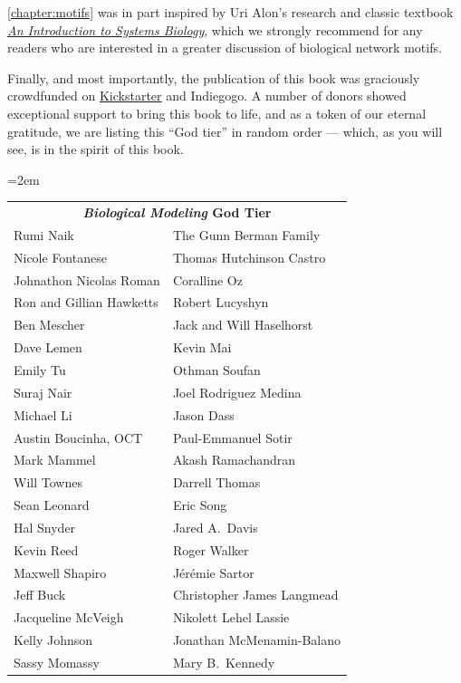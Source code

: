 \autoref{chapter:motifs} was in part inspired by Uri Alon’s research and classic textbook \href{https://www.weizmann.ac.il/mcb/UriAlon/introduction-systems-biology-design-principles-biological-circuits}{\textit{An Introduction to Systems Biology}}, which we strongly recommend for any readers who are interested in a greater discussion of biological network motifs.

Finally, and most importantly, the publication of this book was graciously crowdfunded on \href{https://www.kickstarter.com/projects/phillipcompeau/biological-modeling-a-short-tour?ref=user_menu}{Kickstarter} and Indiegogo. A number of donors showed exceptional support to bring this book to life, and as a token of our eternal gratitude, we are listing this ``God tier'' in random order --- which, as you will see, is in the spirit of this book.
\begin{center}
\tabcolsep=2em
\begin{tabular}{l l}
\multicolumn{2}{c}{\textbf{\textit{Biological Modeling} God Tier}}\\[4ex]
Rumi Naik & The Gunn Berman Family\\
Nicole Fontanese & Thomas Hutchinson Castro\\
Johnathon Nicolas Roman & Coralline Oz\\
Ron and Gillian Hawketts & Robert Lucyshyn\\
Ben Mescher & Jack and Will Haselhorst\\
Dave Lemen & Kevin Mai\\
Emily Tu & Othman Soufan\\
Suraj Nair & Joel Rodriguez Medina\\
Michael Li & Jason Dass\\
Austin Boucinha, OCT & Paul-Emmanuel Sotir\\
Mark Mammel & Akash Ramachandran\\
Will Townes & Darrell Thomas\\
Sean Leonard & Eric Song\\
Hal Snyder & Jared A.~Davis\\
Kevin Reed & Roger Walker\\
Maxwell Shapiro & Jérémie Sartor\\
Jeff Buck & Christopher James Langmead\\
Jacqueline McVeigh & Nikolett Lehel Lassie\\
Kelly Johnson & Jonathan McMenamin-Balano\\
Sassy Momassy & Mary B.~Kennedy\\

\end{tabular}
\end{center}
